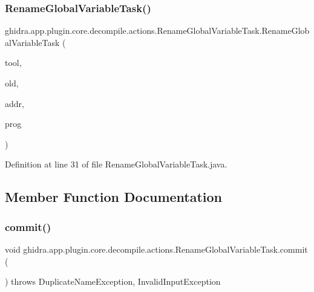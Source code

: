 \subsubsection{\texorpdfstring{RenameGlobalVariableTask()}{RenameGlobalVariableTask()}}
{\footnotesize\ttfamily ghidra.\+app.\+plugin.\+core.\+decompile.\+actions.\+Rename\+Global\+Variable\+Task.\+Rename\+Global\+Variable\+Task (\begin{DoxyParamCaption}\item[{Plugin\+Tool}]{tool,  }\item[{String}]{old,  }\item[{\mbox{\hyperlink{class_address}{Address}}}]{addr,  }\item[{Program}]{prog }\end{DoxyParamCaption})\hspace{0.3cm}{\ttfamily [inline]}}



Definition at line 31 of file Rename\+Global\+Variable\+Task.\+java.



\subsection{Member Function Documentation}
\mbox{\label{classghidra_1_1app_1_1plugin_1_1core_1_1decompile_1_1actions_1_1_rename_global_variable_task_aff31159c80123386fd113610f8eac9a2}} 
\subsubsection{\texorpdfstring{commit()}{commit()}}
{\footnotesize\ttfamily void ghidra.\+app.\+plugin.\+core.\+decompile.\+actions.\+Rename\+Global\+Variable\+Task.\+commit (\begin{DoxyParamCaption}{ }\end{DoxyParamCaption}) throws Duplicate\+Name\+Exception, Invalid\+Input\+Exception\hspace{0.3cm}{\ttfamily [inline]}}



